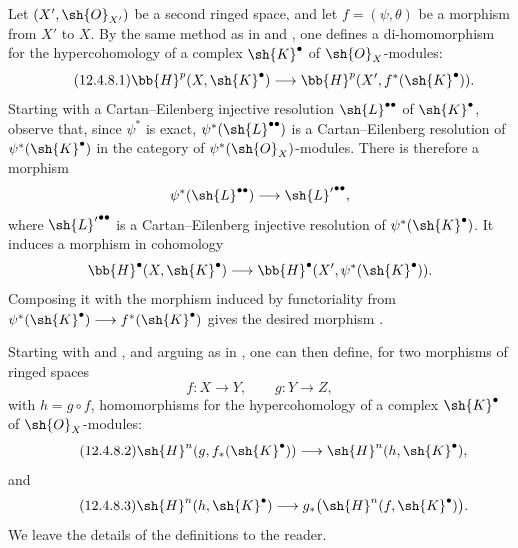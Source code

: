 \begin{env}[12.4.8]
\label{0.12.4.8}
Let $(X',\sh{O}_{X'})$ be a second ringed space, and let
$f=(\psi,\theta)$ be a morphism from $X'$ to $X$.
By the same method as in  and , one
defines a di-homomorphism for the hypercohomology of a complex
$\sh{K}^\bullet$ of $\sh{O}_X$-modules:
\begin{equation}
\label{0.12.4.8.1}
\tag{12.4.8.1}
  \bb{H}^p(X,\sh{K}^\bullet)
  \longrightarrow
  \bb{H}^p(X',f^*(\sh{K}^\bullet)).
\end{equation}
Starting with a Cartan--Eilenberg injective resolution
$\sh{L}^{\bullet\bullet}$ of $\sh{K}^\bullet$, observe that, since
$\psi^*$ is exact, $\psi^*(\sh{L}^{\bullet\bullet})$ is a
Cartan--Eilenberg resolution of $\psi^*(\sh{K}^\bullet)$ in the
category of $\psi^*(\sh{O}_X)$-modules.
There is therefore a morphism
\[
  \psi^*(\sh{L}^{\bullet\bullet})
  \longrightarrow
  {\sh{L}'}^{\bullet\bullet},
\]
where ${\sh{L}'}^{\bullet\bullet}$ is a Cartan--Eilenberg injective
resolution of $\psi^*(\sh{K}^\bullet)$.
It induces a morphism in cohomology
\[
  \bb{H}^\bullet(X,\sh{K}^\bullet)
  \longrightarrow
  \bb{H}^\bullet
  (X',\psi^*(\sh{K}^\bullet)).
\]
Composing it with the morphism induced by functoriality from
$\psi^*(\sh{K}^\bullet)\longrightarrow f^*(\sh{K}^\bullet)$ gives
the desired morphism .

Starting with  and , and arguing as
in , one can then define, for two morphisms of ringed
spaces
\[
  f:X\longrightarrow Y,
  \qquad
  g:Y\longrightarrow Z,
\]
with $h=g\circ f$, homomorphisms for the hypercohomology of a complex
$\sh{K}^\bullet$ of $\sh{O}_X$-modules:
\begin{equation}
\label{0.12.4.8.2}
\tag{12.4.8.2}
  \sh{H}^n(g,f_*(\sh{K}^\bullet))
  \longrightarrow
  \sh{H}^n(h,\sh{K}^\bullet),
\end{equation}
and
\begin{equation}
\label{0.12.4.8.3}
\tag{12.4.8.3}
  \sh{H}^n(h,\sh{K}^\bullet)
  \longrightarrow
  g_*\bigl(\sh{H}^n(f,\sh{K}^\bullet)\bigr).
\end{equation}
We leave the details of the definitions to the reader.
\end{env}
